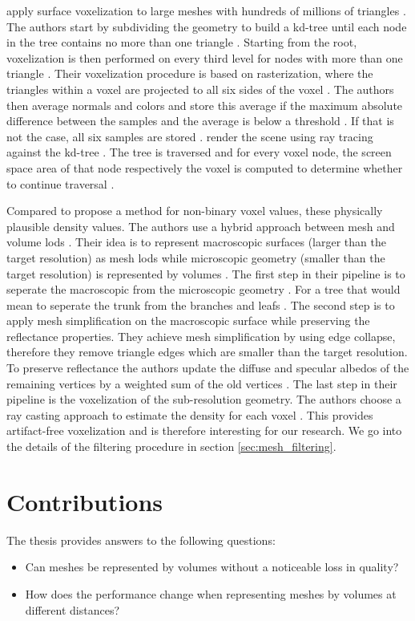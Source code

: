 \citeauthor{afra_voxel_lods} apply surface voxelization to large meshes with hundreds of millions of triangles \cite{afra_voxel_lods}.
The authors start by subdividing the geometry to build a kd-tree until each node in the tree contains no more than one triangle \cite{afra_voxel_lods}.
Starting from the root, voxelization is then performed on every third level for nodes with more than one triangle \cite{afra_voxel_lods}.
Their voxelization procedure is based on rasterization, where the triangles within a voxel are projected to all six sides of the voxel \cite{afra_voxel_lods}.
The authors then average normals and colors and store this average if the maximum absolute difference between the samples and the average is below a threshold \cite{afra_voxel_lods}.
If that is not the case, all six samples are stored \cite{afra_voxel_lods}.
\citeauthor{afra_voxel_lods} render the scene using ray tracing against the kd-tree \cite{afra_voxel_lods}.
The tree is traversed and for every voxel node, the screen space area of that node respectively the voxel is computed to determine whether to continue traversal \cite{afra_voxel_lods}.

Compared to \citeauthor{afra_voxel_lods} \citeauthor{hybrid_mesh_volume_lods} propose a method for non-binary voxel values, these physically plausible density values.
The authors use a hybrid approach between mesh and volume \acp{lod} \cite{hybrid_mesh_volume_lods}.
Their idea is to represent macroscopic surfaces (larger than the target resolution) as mesh \acsp{lod} while microscopic geometry (smaller than the target resolution) is represented by volumes \cite{hybrid_mesh_volume_lods}.
The first step in their pipeline is to seperate the macroscopic from the microscopic geometry \cite{hybrid_mesh_volume_lods}.
For a tree that would mean to seperate the trunk from the branches and leafs \cite{hybrid_mesh_volume_lods}.
The second step is to apply mesh simplification on the macroscopic surface while preserving the reflectance properties.
They achieve mesh simplification by using edge collapse, therefore they remove triangle edges which are smaller than the target resolution.
To preserve reflectance the authors update the diffuse and specular albedos of the remaining vertices by a weighted sum of the old vertices \cite{hybrid_mesh_volume_lods}.
The last step in their pipeline is the voxelization of the sub-resolution geometry.
The authors choose a ray casting approach to estimate the density for each voxel \cite{hybrid_mesh_volume_lods}.
This provides artifact-free voxelization and is therefore interesting for our research.
We go into the details of the filtering procedure in section \ref{sec:mesh_filtering}.





\section{Contributions}
The thesis provides answers to the following questions:
\begin{itemize}
	\item Can meshes be represented by volumes without a noticeable loss in quality?
	\item How does the performance change when representing meshes by volumes at different distances?
\end{itemize}
